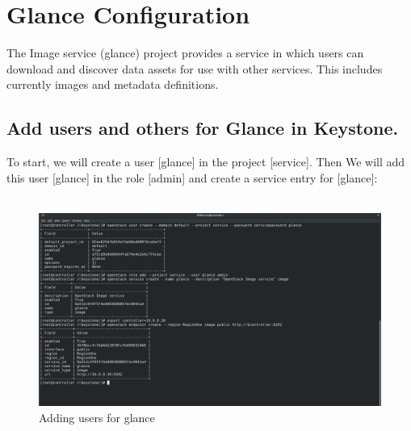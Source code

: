 \chapter{Glance Configuration}
\begin{spacing}{1.2}


\par The Image service (glance) project provides a service in which users can download
and discover data assets for use with other services. This includes
currently images and metadata definitions. \\

\section{Add users and others for Glance in Keystone.}

\par To start, we will create a user [glance] in the project [service]. 
Then We will add this user [glance] in the role [admin] and create a service entry
for [glance]:  \\
\\
\begin{figure}[!htb] 
\begin{center} 
\includegraphics[width=1\linewidth]{Cloud/Configure Glance/Adding users for glance} 
\end{center} 
\caption{Adding users for glance} 
\end{figure}  \FloatBarrier
\\



\end{spacing}
